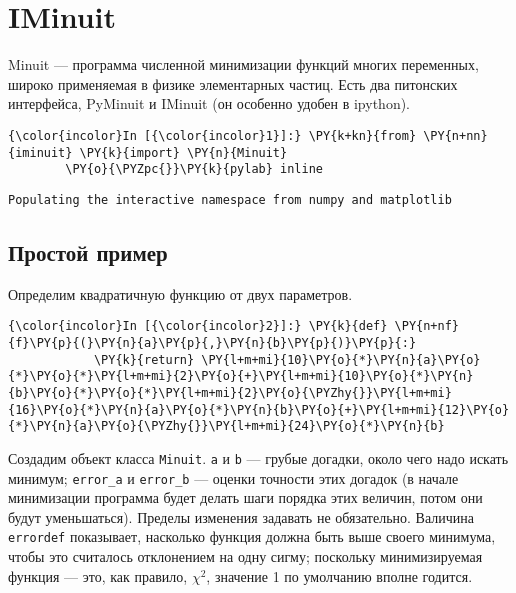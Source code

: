 \section{IMinuit}
\label{S25a}

Minuit --- программа численной минимизации функций многих переменных,
широко применяемая в физике элементарных частиц. Есть два питонских
интерфейса, PyMinuit и IMinuit (он особенно удобен в ipython).

    \begin{Verbatim}[commandchars=\\\{\}]
{\color{incolor}In [{\color{incolor}1}]:} \PY{k+kn}{from} \PY{n+nn}{iminuit} \PY{k}{import} \PY{n}{Minuit}
        \PY{o}{\PYZpc{}}\PY{k}{pylab} inline
\end{Verbatim}


    \begin{Verbatim}[commandchars=\\\{\}]
Populating the interactive namespace from numpy and matplotlib

    \end{Verbatim}

    \subsection{Простой
пример}\label{ux43fux440ux43eux441ux442ux43eux439-ux43fux440ux438ux43cux435ux440}

Определим квадратичную функцию от двух параметров.

    \begin{Verbatim}[commandchars=\\\{\}]
{\color{incolor}In [{\color{incolor}2}]:} \PY{k}{def} \PY{n+nf}{f}\PY{p}{(}\PY{n}{a}\PY{p}{,}\PY{n}{b}\PY{p}{)}\PY{p}{:}
            \PY{k}{return} \PY{l+m+mi}{10}\PY{o}{*}\PY{n}{a}\PY{o}{*}\PY{o}{*}\PY{l+m+mi}{2}\PY{o}{+}\PY{l+m+mi}{10}\PY{o}{*}\PY{n}{b}\PY{o}{*}\PY{o}{*}\PY{l+m+mi}{2}\PY{o}{\PYZhy{}}\PY{l+m+mi}{16}\PY{o}{*}\PY{n}{a}\PY{o}{*}\PY{n}{b}\PY{o}{+}\PY{l+m+mi}{12}\PY{o}{*}\PY{n}{a}\PY{o}{\PYZhy{}}\PY{l+m+mi}{24}\PY{o}{*}\PY{n}{b}
\end{Verbatim}


    Создадим объект класса \texttt{Minuit}. \texttt{a} и \texttt{b} --- грубые
догадки, около чего надо искать минимум; \texttt{error\_a} и
\texttt{error\_b} --- оценки точности этих догадок (в начале минимизации
программа будет делать шаги порядка этих величин, потом они будут
уменьшаться). Пределы изменения задавать не обязательно. Валичина
\texttt{errordef} показывает, насколько функция должна быть выше своего
минимума, чтобы это считалось отклонением на одну сигму; поскольку
минимизируемая функция --- это, как правило, \(\chi^2\), значение 1 по
умолчанию вполне годится.

